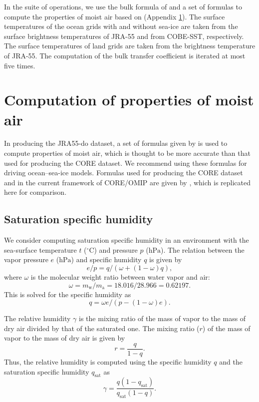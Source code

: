 \documentclass[dvipdfmx]{elsarticle_mod}
\begin{document}
In the suite of operations, we use the bulk formula of \citet{Large_and_Yeager_2009} and a set of formulas to compute the properties of moist air based on \citet{Gill_1982} (Appendix \ref{app:air}). The surface temperatures of the ocean grids with and without sea-ice are taken from the surface brightness temperatures of JRA-55 and from COBE-SST, respectively. The surface temperatures of land grids are taken from the brightness temperature of JRA-55. The computation of the bulk transfer coefficient is iterated at most five times.

\section{Computation of properties of moist air}
\label{app:air}

In producing the JRA55-do dataset, a set of formulas given by \citet{Gill_1982} is used to compute properties of moist air, which is thought to be more accurate than that used for producing the CORE dataset. We recommend using these formulas for driving ocean--sea-ice models. Formulas used for producing the CORE dataset and in the current framework of CORE/OMIP are given by \citet{Large_and_Yeager_2004}, which is replicated here for comparison.

\subsection{Saturation specific humidity}

We consider computing saturation specific humidity in an environment with the sea-surface temperature $t$ ($^{\circ}\mathrm{C}$) and pressure $p$ ($\mathrm{hPa}$). The relation between the vapor pressure $e$ ($\mathrm{hPa}$) and specific humidity $q$ is given by
\begin{equation}
   e/p = q /(\omega + (1-\omega)q),
\end{equation}
where $\omega$ is the molecular weight ratio between water vapor and air:
\begin{equation}
 \omega = m_{\mathrm{w}}/m_{\mathrm{a}} = 18.016/28.966 = 0.62197.
\end{equation}
This is solved for the specific humidity as
\begin{equation}
   q = \omega e/(p - (1-\omega)e).
   \label{eq:def-specific_humidity}
\end{equation}

The relative humidity $\gamma$ is the mixing ratio of the mass of vapor to the mass of dry air divided by that of the saturated one. The mixing ratio ($r$) of the mass of vapor to the mass of dry air is given by
\begin{equation}
r = \frac{q}{1-q}.
\end{equation}
Thus, the relative humidity is computed using the specific humidity $q$ and the saturation specific humidity $q_{\mathrm{sat}}$ as
\begin{equation}
\gamma = \frac{q (1-q_{\mathrm{sat}})}{q_{\mathrm{sat}}(1-q)}.
\end{equation}
\end{document}
